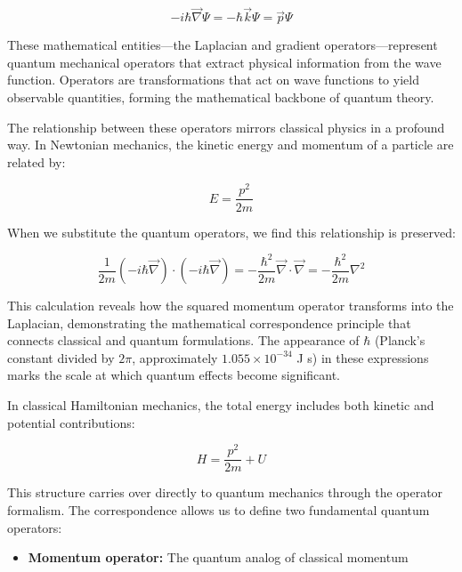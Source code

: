 \documentclass[italian]{HKNdocument}
\begin{document}
\begin{equation}
-i \hbar \vec{\nabla} \Psi=-\hbar \vec{k} \Psi=\vec{p} \Psi \label{eq:1.9}
\end{equation}

These mathematical entities—the Laplacian and gradient operators—represent quantum mechanical operators that extract physical information from the wave function. Operators are transformations that act on wave functions to yield observable quantities, forming the mathematical backbone of quantum theory.

The relationship between these operators mirrors classical physics in a profound way. In Newtonian mechanics, the kinetic energy and momentum of a particle are related by:

\begin{equation}
E=\frac{p^{2}}{2 m} \label{eq:1.10}
\end{equation}

When we substitute the quantum operators, we find this relationship is preserved:

\begin{equation}
\frac{1}{2 m}(-i \hbar \vec{\nabla}) \cdot(-i \hbar \vec{\nabla})=-\frac{\hbar^{2}}{2 m} \vec{\nabla} \cdot \vec{\nabla}=-\frac{\hbar^{2}}{2 m} \nabla^{2} \label{eq:1.11}
\end{equation}

This calculation reveals how the squared momentum operator transforms into the Laplacian, demonstrating the mathematical correspondence principle that connects classical and quantum formulations. The appearance of $\hbar$ (Planck's constant divided by $2\pi$, approximately $1.055 \times 10^{-34}$ J s) in these expressions marks the scale at which quantum effects become significant.

In classical Hamiltonian mechanics, the total energy includes both kinetic and potential contributions:

\begin{equation}
H=\frac{p^{2}}{2 m}+U \label{eq:1.12}
\end{equation}

This structure carries over directly to quantum mechanics through the operator formalism. The correspondence allows us to define two fundamental quantum operators:

\begin{itemize}
  \item \textbf{Momentum operator:} The quantum analog of classical momentum
\end{itemize}
\end{document}

